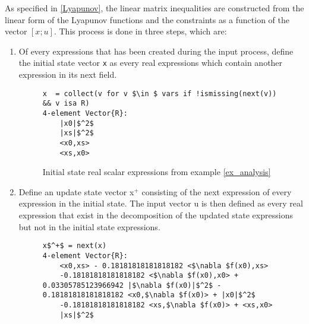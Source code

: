 As specified in \ref{Lyapunov}, the linear matrix inequalities are constructed from the linear form of the Lyapunov functions and the constraints as a function of the vector $[x; u]$. This process is done in three steps, which are:
\begin{enumerate}
    \item Of every expressions that has been created during the input process, define the initial state vector \texttt{x} as every real expressions which contain another expression in its next field.
\begin{figure}[h!]
    \begin{lstlisting}[mathescape]
x  = collect(v for v $\in $ vars if !ismissing(next(v)) && v isa R)
4-element Vector{R}:
    |x0|$^2$
    |xs|$^2$
    <x0,xs>
    <xs,x0>
\end{lstlisting}
\caption{Initial state real scalar expressions from example \ref{ex_analysis}}
\label{ex_initstate}
\end{figure}

    \item Define an update state vector x$^+$ consisting of the next expression of every expression in the initial state. The input vector u is then defined as every real expression that exist in the decomposition of the updated state expressions but not in the initial state expressions.
    \begin{figure}[h!]
        \begin{lstlisting}[mathescape]    
x$^+$ = next(x)
4-element Vector{R}:
    <x0,xs> - 0.18181818181818182 <$\nabla $f(x0),xs>
    -0.18181818181818182 <$\nabla $f(x0),x0> + 0.03305785123966942 |$\nabla $f(x0)|$^2$ - 0.18181818181818182 <x0,$\nabla $f(x0)> + |x0|$^2$
    -0.18181818181818182 <xs,$\nabla $f(x0)> + <xs,x0>
    |xs|$^2$


\end{lstlisting}
\end{figure}
\end{enumerate}
